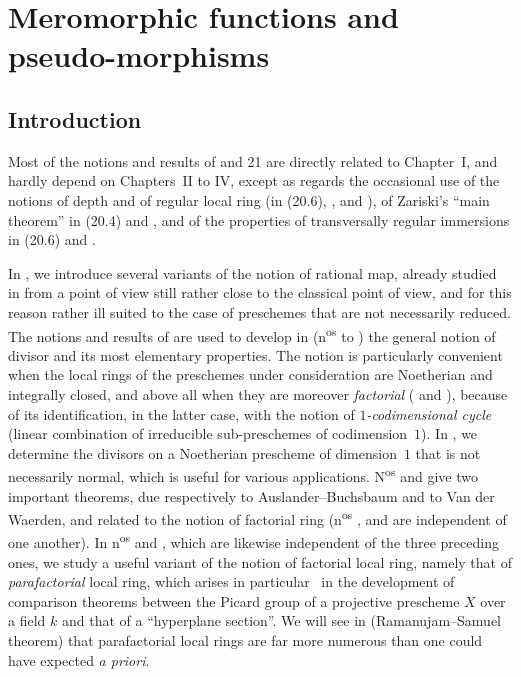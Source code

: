 \section{Meromorphic functions and pseudo-morphisms}

\setcounter{subsection}{-1}
\subsection{Introduction}

Most of the notions and results of \textsection{} and 21 are directly related to Chapter~I, and hardly depend on Chapters~II to IV, except as regards the occasional use of the notions of depth and of regular local ring (in (20.6), ,  and ), of Zariski's ``main theorem'' in (20.4) and , and of the properties of transversally regular immersions in (20.6) and .

In , we introduce several variants of the notion of rational map, already studied in  from a point of view still rather close to the classical point of view, and for this reason rather ill suited to the case of preschemes that are not necessarily reduced.
The notions and results of  are used to develop in  (n\textsuperscript{os}  to ) the general notion of divisor and its most elementary properties.
The notion is particularly convenient when the local rings of the preschemes under consideration are Noetherian and integrally closed, and above all when they are moreover \emph{factorial} ( and ), because of its identification, in the latter case, with the notion of \emph{$1$-codimensional cycle} (linear combination of irreducible sub-preschemes of codimension~$1$).
In , we determine the divisors on a Noetherian prescheme of dimension~$1$ that is not necessarily normal, which is useful for various applications.
N\textsuperscript{os}  and  give two important theorems, due respectively to Auslander--Buchsbaum and to Van der Waerden, and related to the notion of factorial ring (n\textsuperscript{os} ,  and  are independent of one another).
In n\textsuperscript{os}  and , which are likewise independent of the three preceding ones, we study a useful variant of the notion of factorial local ring, namely that of \emph{parafactorial} local ring, which arises in particular~\cite{IV-41} in the development of comparison theorems between the Picard group of a projective prescheme $X$ over a field $k$ and that of a ``hyperplane section''.
We will see in  (Ramanujam--Samuel theorem) that parafactorial local rings are far more numerous than one could have expected \emph{a priori}.


